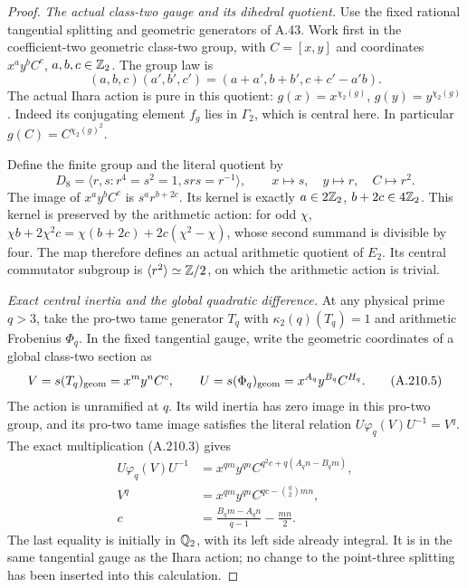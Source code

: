 \begin{proof}
\emph{The actual class-two gauge and its dihedral quotient.}
Use the fixed rational tangential splitting and geometric
generators of A.43.  Work first in the coefficient-two
geometric class-two group, with \(C=[x,y]\) and coordinates
\(x^a y^b C^c\), \(a,b,c\in\mathbb Z_2\).  The group law is
\[
 (a,b,c)(a',b',c')=(a+a',b+b',c+c'-a'b).
\tag{A.210.3}
\]
The actual Ihara action is pure in this quotient:
\(g(x)=x^{\chi_2(g)}\), \(g(y)=y^{\chi_2(g)}\).
Indeed its conjugating element \(f_g\) lies in
\(\Gamma_2\), which is central here.  In particular
\(g(C)=C^{\chi_2(g)^2}\).

Define the finite group and the literal quotient by
\[
 D_8=\langle r,s:r^4=s^2=1, srs=r^{-1}\rangle,
 \qquad x\longmapsto s,\quad y\longmapsto r,\quad
                         C\longmapsto r^2.
\tag{A.210.4}
\]
The image of \(x^a y^bC^c\) is \(s^a r^{b+2c}\).
Its kernel is exactly
\(a\in2\mathbb Z_2\), \(b+2c\in4\mathbb Z_2\).
This kernel is preserved by the arithmetic action:
for odd \(\chi\),
\(\chi b+2\chi^2c=\chi(b+2c)+2c(\chi^2-\chi)\),
whose second summand is divisible by four.
The map therefore defines an actual arithmetic quotient
of \(E_2\).  Its central commutator subgroup is
\(\langle r^2\rangle\simeq\mathbb Z/2\), on which the
arithmetic action is trivial.

\emph{Exact central inertia and the global quadratic difference.}
At any physical prime \(q>3\), take the pro-two tame
generator \(T_q\) with \(\kappa_2(q)(T_q)=1\) and
arithmetic Frobenius \(\Phi_q\).  In the fixed tangential
gauge, write the geometric coordinates of a global
class-two section as
\[
 V=s(T_q)_{\rm geom}=x^m y^n C^c,\qquad
 U=s(\Phi_q)_{\rm geom}=x^{A_q}y^{B_q}C^{H_q}.
\tag{A.210.5}
\]
The action is unramified at \(q\).  Its wild inertia
has zero image in this pro-two group, and its pro-two
tame image satisfies the literal relation
\(U\varphi_q(V)U^{-1}=V^q\).
The exact multiplication (A.210.3) gives
\[
 \begin{aligned}
 U\varphi_q(V)U^{-1}
   &=x^{qm}y^{qn}C^{q^2c+q(A_qn-B_qm)},\\
 V^q&=x^{qm}y^{qn}C^{qc-\binom q2mn},\\
 c&=\frac{B_qm-A_qn}{q-1}-\frac{mn}{2}.
 \end{aligned}
\tag{A.210.6}
\]
The last equality is initially in \(\mathbb Q_2\), with its
left side already integral.  It is in the same tangential
gauge as the Ihara action; no change to the point-three
splitting has been inserted into this calculation.


\end{proof}
